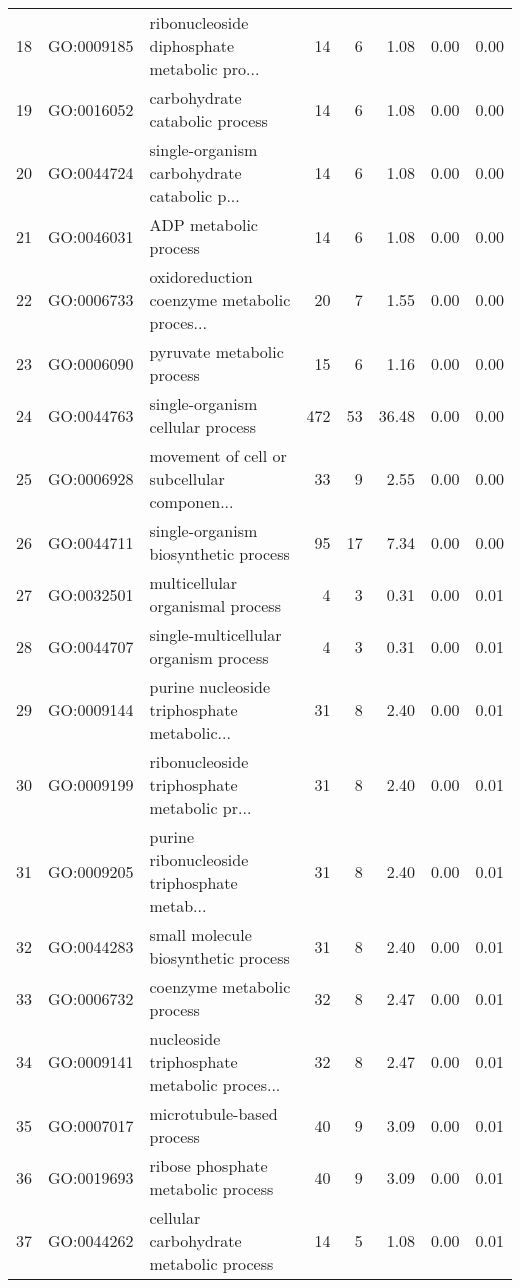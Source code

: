 \begin{table}[ht]
\begin{tabular}{rllrrrrr}
  18 & GO:0009185 & ribonucleoside diphosphate metabolic pro... &  14 &   6 & 1.08 & 0.00 & 0.00 \\ 
  19 & GO:0016052 & carbohydrate catabolic process &  14 &   6 & 1.08 & 0.00 & 0.00 \\ 
  20 & GO:0044724 & single-organism carbohydrate catabolic p... &  14 &   6 & 1.08 & 0.00 & 0.00 \\ 
  21 & GO:0046031 & ADP metabolic process &  14 &   6 & 1.08 & 0.00 & 0.00 \\ 
  22 & GO:0006733 & oxidoreduction coenzyme metabolic proces... &  20 &   7 & 1.55 & 0.00 & 0.00 \\ 
  23 & GO:0006090 & pyruvate metabolic process &  15 &   6 & 1.16 & 0.00 & 0.00 \\ 
  24 & GO:0044763 & single-organism cellular process & 472 &  53 & 36.48 & 0.00 & 0.00 \\ 
  25 & GO:0006928 & movement of cell or subcellular componen... &  33 &   9 & 2.55 & 0.00 & 0.00 \\ 
  26 & GO:0044711 & single-organism biosynthetic process &  95 &  17 & 7.34 & 0.00 & 0.00 \\ 
  27 & GO:0032501 & multicellular organismal process &   4 &   3 & 0.31 & 0.00 & 0.01 \\ 
  28 & GO:0044707 & single-multicellular organism process &   4 &   3 & 0.31 & 0.00 & 0.01 \\ 
  29 & GO:0009144 & purine nucleoside triphosphate metabolic... &  31 &   8 & 2.40 & 0.00 & 0.01 \\ 
  30 & GO:0009199 & ribonucleoside triphosphate metabolic pr... &  31 &   8 & 2.40 & 0.00 & 0.01 \\ 
  31 & GO:0009205 & purine ribonucleoside triphosphate metab... &  31 &   8 & 2.40 & 0.00 & 0.01 \\ 
  32 & GO:0044283 & small molecule biosynthetic process &  31 &   8 & 2.40 & 0.00 & 0.01 \\ 
  33 & GO:0006732 & coenzyme metabolic process &  32 &   8 & 2.47 & 0.00 & 0.01 \\ 
  34 & GO:0009141 & nucleoside triphosphate metabolic proces... &  32 &   8 & 2.47 & 0.00 & 0.01 \\ 
  35 & GO:0007017 & microtubule-based process &  40 &   9 & 3.09 & 0.00 & 0.01 \\ 
  36 & GO:0019693 & ribose phosphate metabolic process &  40 &   9 & 3.09 & 0.00 & 0.01 \\ 
  37 & GO:0044262 & cellular carbohydrate metabolic process &  14 &   5 & 1.08 & 0.00 & 0.01 \\ 

\end{tabular}
\end{table}

